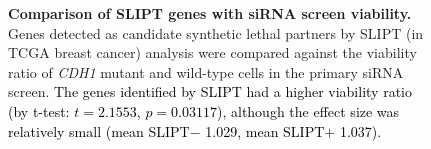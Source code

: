 \begin{figure}[!htbp]
\begin{center}
   \end{center}
   \caption[Comparison of SLIPT genes with siRNA screen viability]{\small \textbf{Comparison of \gls{SLIPT} genes with \gls{siRNA} screen viability.} Genes detected as candidate \gls{synthetic lethal} partners by \gls{SLIPT} (in \gls{TCGA} breast cancer)  analysis were compared against the viability ratio of \textit{CDH1} \gls{mutant} and \gls{wild-type} cells in the primary \gls{siRNA} screen. %
   \textcolor{black}{The genes identified by \gls{SLIPT} had a higher viability ratio (by t-test: $t=2.1553$, $p=0.03117$), although the effect size was relatively small (mean SLIPT$-$ 1.029, mean SLIPT$+$ 1.037).}  %
}
\label{fig:compare_viability_SL}
\end{figure}

